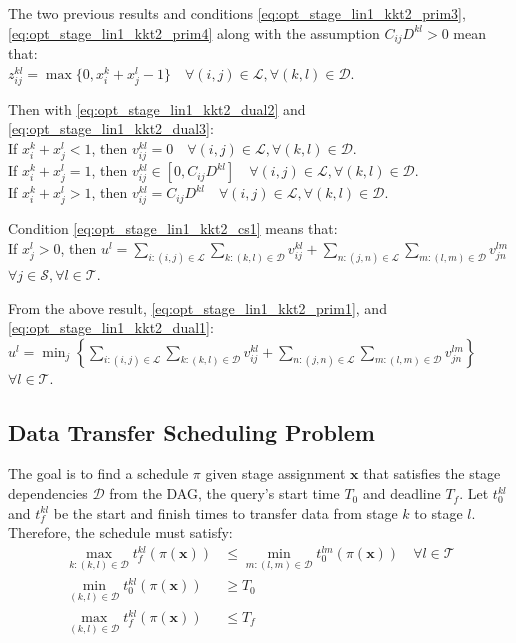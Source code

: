 The two previous results and conditions \eqref{eq:opt_stage_lin1_kkt2_prim3}, \eqref{eq:opt_stage_lin1_kkt2_prim4} along with the assumption $C_{ij}D^{kl}>0$ mean that:\\
$z_{ij}^{kl}=\max\{0,x_i^k+x_j^l-1\} \quad \forall (i,j)\in\mathcal{L}, \forall(k,l)\in\mathcal{D}$.

Then with \eqref{eq:opt_stage_lin1_kkt2_dual2} and \eqref{eq:opt_stage_lin1_kkt2_dual3}:\\
If $x_i^k+x_j^l<1$, then $v_{ij}^{kl}=0 \quad \forall (i,j)\in\mathcal{L}, \forall(k,l)\in\mathcal{D}$.\\
If $x_i^k+x_j^l=1$, then $v_{ij}^{kl}\in[0,C_{ij}D^{kl}] \quad \forall (i,j)\in\mathcal{L}, \forall(k,l)\in\mathcal{D}$.\\
If $x_i^k+x_j^l>1$, then $v_{ij}^{kl}=C_{ij}D^{kl} \quad \forall (i,j)\in\mathcal{L}, \forall(k,l)\in\mathcal{D}$.

Condition \eqref{eq:opt_stage_lin1_kkt2_cs1} means that:\\
If $x_j^l>0$, then $ u^l=\sum_{i:(i,j)\in\mathcal{L}}\sum_{k:(k,l)\in\mathcal{D}}v_{ij}^{kl}+\sum_{n:(j,n)\in\mathcal{L}}\sum_{m:(l,m)\in\mathcal{D}}v_{jn}^{lm}$\\
$\forall j\in\mathcal{S},\forall l\in\mathcal{T}$.

From the above result, \eqref{eq:opt_stage_lin1_kkt2_prim1}, and \eqref{eq:opt_stage_lin1_kkt2_dual1}:\\
$u^l=\min_{j}\left\{\sum_{i:(i,j)\in\mathcal{L}}\sum_{k:(k,l)\in\mathcal{D}}v_{ij}^{kl}+\sum_{n:(j,n)\in\mathcal{L}}\sum_{m:(l,m)\in\mathcal{D}}v_{jn}^{lm}\right\}$ \\
$\forall l\in\mathcal{T}$.


\subsection{Data Transfer Scheduling Problem}

The goal is to find a schedule $\pi$ given stage assignment $\mathbf{x}$ that satisfies the stage dependencies $\mathcal{D}$ from the DAG, the query's start time $T_0$ and deadline $T_f$.
Let $t_0^{kl}$ and $t_f^{kl}$ be the start and finish times to transfer data from stage $k$ to stage $l$.
Therefore, the schedule must satisfy:
\begin{subequations}
	\begin{align}
		\max_{k:(k,l)\in\mathcal{D}}t_f^{kl}(\pi(\mathbf{x})) & \leq \min_{m:(l,m)\in\mathcal{D}}t_0^{lm}(\pi(\mathbf{x})) \quad \forall l\in\mathcal{T} \\
		\min_{(k,l)\in\mathcal{D}}t_0^{kl}(\pi(\mathbf{x})) & \geq T_0 \\
		\max_{(k,l)\in\mathcal{D}}t_f^{kl}(\pi(\mathbf{x})) & \leq T_f
	\end{align}
\end{subequations}

